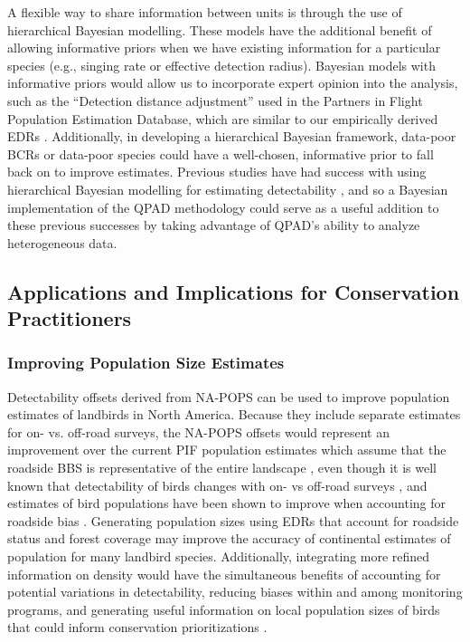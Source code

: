 \par A flexible way to share information between units is through the use of hierarchical Bayesian modelling. These models have the additional benefit of allowing informative priors when we have existing information for a particular species (e.g., singing rate or effective detection radius). Bayesian models with informative priors would allow us to incorporate expert opinion into the analysis, such as the “Detection distance adjustment” used in the Partners in Flight Population Estimation Database, which are similar to our empirically derived EDRs \citep{rosenberg_partners_2016, will_handbook_2020}. Additionally, in developing a hierarchical Bayesian framework, data-poor BCRs or data-poor species could have a well-chosen, informative prior to fall back on to improve estimates. Previous studies have had success with using hierarchical Bayesian modelling for estimating detectability \citep{amundson_hierarchical_2014, sollmann_hierarchical_2016}, and so a Bayesian implementation of the QPAD methodology could serve as a useful addition to these previous successes by taking advantage of QPAD’s ability to analyze heterogeneous data.

\subsection{Applications and Implications for Conservation Practitioners}
\subsubsection{Improving Population Size Estimates}

\par Detectability offsets derived from NA-POPS can be used to improve population estimates of landbirds in North America. Because they include separate estimates for on- vs. off-road surveys, the NA-POPS offsets would represent an improvement over the current PIF population estimates which assume that the roadside BBS is representative of the entire landscape \citep{rosenberg_partners_2016, stanton_estimating_2019}, even though it is well known that detectability of birds changes with on- vs off-road surveys \citep{sauer_first_2017, yip_sound_2017, cooke_road_2020}, and estimates of bird populations have been shown to improve when accounting for roadside bias \citep{solymos_lessons_2020}. Generating population sizes using EDRs that account for roadside status and forest coverage may improve the accuracy of continental estimates of population for many landbird species. Additionally, integrating more refined information on density would have the simultaneous benefits of accounting for potential variations in detectability, reducing biases within and among monitoring programs, and generating useful information on local population sizes of birds that could inform conservation prioritizations \citep{veloz_improving_2015}.

